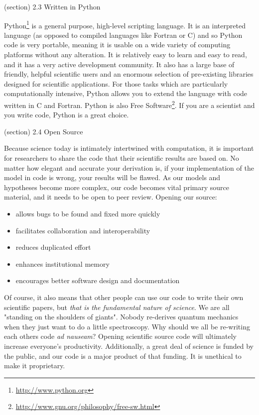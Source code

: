   (section) 2.3 Written in Python

    Python\footnote{\href{http://www.python.org}{http://www.python.org}} is
    a general purpose, high-level scripting language.  It is an interpreted
    language (as opposed to compiled languages like Fortran or C) and so 
    Python code is very portable, meaning it is usable on a wide variety of
    computing platforms without any alteration.  It is relatively easy to 
    learn and easy to read, and it has a very active development community.
    It also has a large base of friendly, helpful scientific users and an 
    enormous selection of pre-existing libraries designed for scientific 
    applications.  For those tasks which are particularly computationally 
    intensive, Python allows you to extend the language with code written 
    in C and Fortran.  Python is also Free 
    Software\footnote{\href{http://www.gnu.org/philosophy/free-sw.html}{http://www.gnu.org/philosophy/free-sw.html}}.
    If you are a scientist and you write code, Python is a great choice.

  (section) 2.4 Open Source

    Because science today is intimately intertwined with computation, it is
    important for researchers to share the code that their scientific 
    results are based on.  No matter how elegant and accurate your 
    derivation is, if your implementation of the model in code is wrong, 
    your results will be flawed. As our models and hypotheses become more 
    complex, our code becomes vital primary source material, and it needs 
    to be open to peer review.  Opening our source:

    \begin{itemize}
    \setlength{\parskip}{0.6ex}
      \item allows bugs to be found and fixed more quickly

      \item facilitates collaboration and interoperability

      \item reduces duplicated effort

      \item enhances institutional memory

      \item encourages better software design and documentation

    \end{itemize}

    Of course, it also means that other people can use our code to write 
    their own scientific papers, but \textit{that is the fundamental nature
    of science}.  We are all "standing on the shoulders of giants".  Nobody
    re-derives quantum mechanics when they just want to do a little 
    spectroscopy.  Why should we all be re-writing each others code 
    \textit{ad nauseam}?  Opening scientific source code will ultimately 
    increase everyone's productivity.  Additionally, a great deal of 
    science is funded by the public, and our code is a major product of 
    that funding.  It is unethical to make it proprietary.


